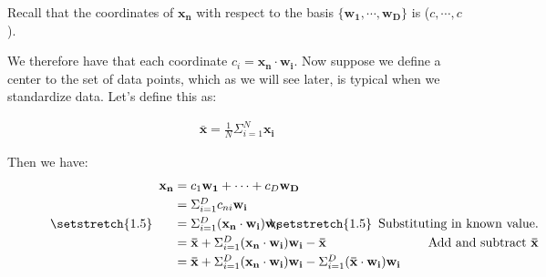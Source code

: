 \documentclass{article}
\begin{document}
\noindent Recall that the coordinates of $\mathbf{x_n}$ with respect to the basis $\{\mathbf{w_1, \cdots, w_D}\}$ is ($c, \cdots, c$).

\vspace{2mm}
\noindent{}

\vspace{2mm}
\noindent We therefore have that each coordinate $c_i = \mathbf{x_n \cdot w_i}$. Now suppose we define a center to the set of data points, which as we will see later, is typical when we standardize data. Let's define this as:

\vspace{-4mm}
\begin{align*}
    \mathbf{\bar{x}} = \frac{1}{N}\Sigma_{i = 1}^{N}\mathbf{x_i}
\end{align*}

\noindent Then we have:
\[
\begin{minipage}{.5\linewidth}
  \centering
  $
  \setstretch{1.5}
  \begin{array}{l@{{}\mathrel{=}{}}l}
    \mathbf{x_n} & c_1\mathbf{w_1} + \cdots + c_D\mathbf{w_D}\\[\jot]
    &\Sigma_{i = 1}^{D}c_{ni}\mathbf{w_i}\\[\jot]
    &\Sigma_{i=1}^{D}\mathbf{(x_n \cdot w_i)w_i}\\[\jot]
    &\mathbf{\bar{x}} + \Sigma_{i=1}^{D}(\mathbf{x_n \cdot w_i)w_i - \bar{x}}\\[\jot]
    &\mathbf{\bar{x}} + \Sigma_{i=1}^{D}(\mathbf{x_n \cdot w_i)w_i} - \Sigma_{i=1}^{D}(\mathbf{\bar{x} \cdot w_i)w_i}\\
  \end{array}$
\end{minipage}%
\begin{minipage}{.35\linewidth}
  \centering
  $
  \setstretch{1.5}
  \begin{array}{r}
    \\[\jot]
    \\[\jot]
    \text{Substituting in known value.}\\[\jot]
    \text{Add and subtract }\mathbf{\bar{x}}\\[\jot]
    \\
  \end{array}$
\end{minipage}
\]
\end{document}
